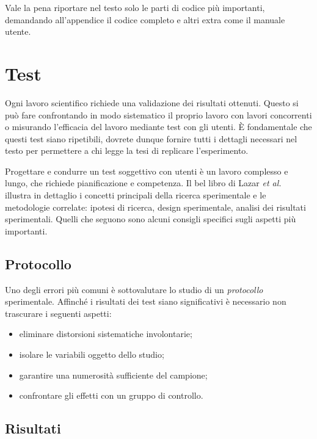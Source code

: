 \documentclass[12pt]{report}
\begin{document}
    Vale la pena riportare nel testo solo le parti di codice più importanti, demandando all'appendice il codice completo e altri extra come il manuale utente.

%
%

    \chapter{Test}
    \label{chap:test}

    Ogni lavoro scientifico richiede una validazione dei risultati ottenuti. Questo si può fare confrontando in modo sistematico il proprio lavoro con lavori concorrenti o misurando l'efficacia del lavoro mediante test con gli utenti. \`E fondamentale che questi test siano ripetibili, dovrete dunque fornire tutti i dettagli necessari nel testo per permettere a chi legge la tesi di replicare l'esperimento.

    Progettare e condurre un test soggettivo con utenti \`e un lavoro complesso e lungo, che richiede pianificazione e competenza. Il bel libro di Lazar {\em et al.}~\cite{lazar2017methods} illustra in dettaglio i concetti principali della ricerca sperimentale e le metodologie correlate: ipotesi di ricerca, design sperimentale, analisi dei risultati sperimentali. Quelli che seguono sono alcuni consigli specifici sugli aspetti pi\`u importanti.

    \section{Protocollo}

    Uno degli errori più comuni è sottovalutare lo studio di un \textit{protocollo} sperimentale. Affinché i risultati dei test siano significativi è necessario non trascurare i seguenti aspetti:

    \begin{itemize}
        \item eliminare distorsioni sistematiche involontarie;
        \item isolare le variabili oggetto dello studio;
        \item garantire una numerosità sufficiente del campione;
        \item confrontare gli effetti con un gruppo di controllo.
    \end{itemize}

    \section{Risultati}
\end{document}
